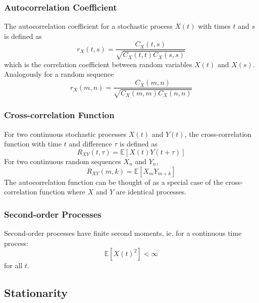 \documentclass[11pt]{report} %
\begin{document}
\subsubsection{Autocorrelation Coefficient}

The autocorrelation coefficient for a stochastic process $X\left(t\right)$ with times $t$ and $s$ is defined as
\begin{equation}
r_{X}\left(t, s\right) = \dfrac{C_{X}\left(t, s\right)}{\sqrt{C_{X}\left(t, t\right)C_{X}\left(s, s\right)}}
\end{equation}
which is the correlation coefficient between random variables $X\left(t\right)$ and $X\left(s\right)$. Analogously for a random sequence
\begin{equation}
r_{X}\left(m, n\right) = \dfrac{C_{X}\left(m, n\right)}{\sqrt{C_{X}\left(m, m\right)C_{X}\left(n, n\right)}}
\end{equation}

\subsubsection{Cross-correlation Function}

For two continuous stochastic processes $X\left(t\right)$ and $Y\left(t\right)$, the cross-correlation function with time $t$ and difference $\tau$ is defined as
\begin{equation}
R_{XY}\left(t, \tau\right) = \mathbb{E}\left[X\left(t\right)Y\left(t + \tau\right)\right]
\end{equation}
For two continuous random sequences $X_{n}$ and $Y_{n}$,
\begin{equation}
R_{XY}\left(m, k\right) = \mathbb{E}\left[X_{m}Y_{m + k}\right]
\end{equation}
The autocorrelation function can be thought of as a special case of the cross-correlation function where $X$ and $Y$ are identical processes.

\subsubsection{Second-order Processes}

Second-order processes have finite second moments, ie. for a continuous time process:
\begin{equation}
\mathbb{E}\left[X\left(t\right)^{2}\right] < \infty
\end{equation}
for all $t$.

\subsection{Stationarity}
\end{document}
